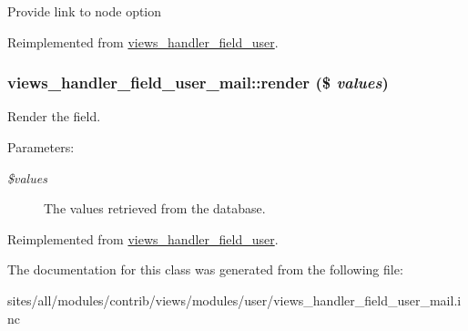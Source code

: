 Provide link to node option 

Reimplemented from \hyperlink{classviews__handler__field__user_ecf77682fa7dc9daf1fa97cbe045420d}{views\_\-handler\_\-field\_\-user}.\hypertarget{classviews__handler__field__user__mail_ab8c63fe4d09cff576f4588838dc363c}{
\subsubsection[{render}]{\setlength{\rightskip}{0pt plus 5cm}views\_\-handler\_\-field\_\-user\_\-mail::render (\$ {\em values})}}
\label{classviews__handler__field__user__mail_ab8c63fe4d09cff576f4588838dc363c}


Render the field.

\begin{Desc}
\item[Parameters:]
\begin{description}
\item[{\em \$values}]The values retrieved from the database. \end{description}
\end{Desc}


Reimplemented from \hyperlink{classviews__handler__field__user_145dcce889ee17821a1d9c65970d86f2}{views\_\-handler\_\-field\_\-user}.

The documentation for this class was generated from the following file:\begin{CompactItemize}
\item 
sites/all/modules/contrib/views/modules/user/views\_\-handler\_\-field\_\-user\_\-mail.inc\end{CompactItemize}
